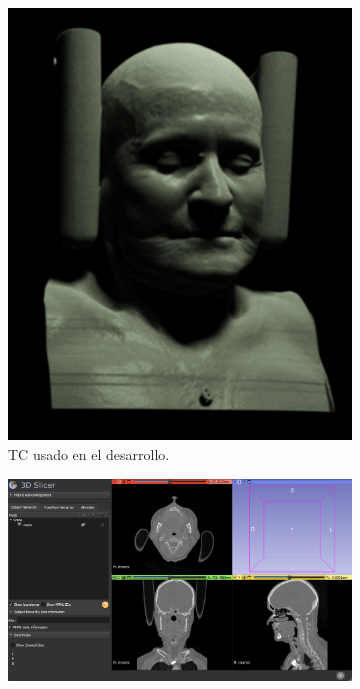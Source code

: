 \begin{figure}
  \centering
  \begin{subfigure}{.4\textwidth}
    \includegraphics[width=\textwidth]{imaxes/manix_full.png}
    \caption{TC usado en el desarrollo.}\label{fig:manix_full}
  \end{subfigure}
  \begin{minipage}[b]{.47\textwidth}
    \begin{subfigure}{\textwidth}
      \centering
      \includegraphics[width=\textwidth]{imaxes/captura3dslicer_2.png}

\end{subfigure}
\end{minipage}
\end{figure}
